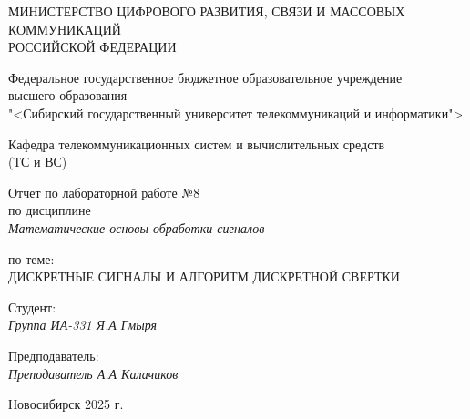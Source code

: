 \thispagestyle{empty}

\begin{center}
    МИНИСТЕРСТВО ЦИФРОВОГО РАЗВИТИЯ, СВЯЗИ И МАССОВЫХ КОММУНИКАЦИЙ \\ РОССИЙСКОЙ ФЕДЕРАЦИИ

    \vspace{20pt}

    Федеральное государственное бюджетное образовательное учреждение  \\  высшего образования \\
    "<Сибирский государственный университет телекоммуникаций и информатики"> \\

    \vspace{20pt}

    Кафедра телекоммуникационных систем и вычислительных средств \\  (ТС и ВС)
\end{center}

\vfill

\begin{center}
    Отчет по лабораторной работе №8 \\  
    по дисциплине \\
    \textit{Математические основы обработки сигналов}

    \vspace{20pt}

    по теме: \\
    \uppercase{Дискретные сигналы и алгоритм дискретной свертки}
\end{center}

\vfill

    \noindent Студент: \\
    \textit{Группа ИА-331 \hfill Я.А Гмыря}

    \vspace{20pt}

    \noindent Предподаватель: \\
    \textit{Преподаватель \hfill А.А Калачиков}

\vfill

\begin{center}
    Новосибирск 2025 г.
\end{center}